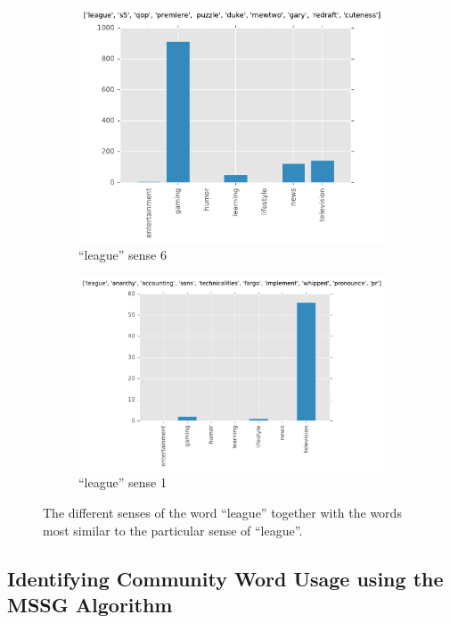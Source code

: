 \begin{landscape}
\begin{figure}[H]
\begin{subfigure}[t]{.3\textwidth}
\centering\includegraphics[]{figures/reddit-league-5.pdf}
\caption{``league'' sense 6}
\label{fig-reddit-league-5}
\end{subfigure}
\begin{subfigure}[t]{.3\textwidth}
\centering\includegraphics[]{figures/reddit-league-6.pdf}
\caption{``league'' sense 1}
\label{fig-reddit-league-7}
\end{subfigure}
\caption{The different senses of the word ``league'' together with the words most similar to the particular sense of ``league''.}
\label{fig-reddit-league} 
\end{figure}

\end{landscape}

\subsection{Identifying Community Word Usage using the MSSG Algorithm}


